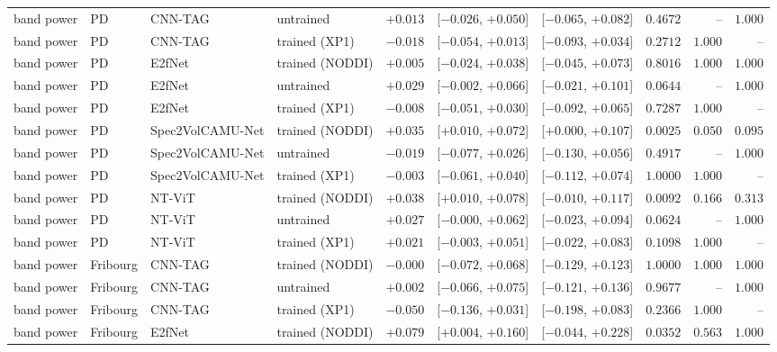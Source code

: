 \documentclass[10pt]{article}
\begin{document}
\begin{longtable}{l l l l r c c r r r}
        band power & PD & CNN-TAG & untrained & $+0.013$ & [$-0.026$, $+0.050$] & [$-0.065$, $+0.082$] & $0.4672$ & -- & $1.000$ \\
        band power & PD & CNN-TAG & trained (XP1) & $-0.018$ & [$-0.054$, $+0.013$] & [$-0.093$, $+0.034$] & $0.2712$ & $1.000$ & -- \\
        band power & PD & E2fNet & trained (NODDI) & $+0.005$ & [$-0.024$, $+0.038$] & [$-0.045$, $+0.073$] & $0.8016$ & $1.000$ & $1.000$ \\
        band power & PD & E2fNet & untrained & $+0.029$ & [$-0.002$, $+0.066$] & [$-0.021$, $+0.101$] & $0.0644$ & -- & $1.000$ \\
        band power & PD & E2fNet & trained (XP1) & $-0.008$ & [$-0.051$, $+0.030$] & [$-0.092$, $+0.065$] & $0.7287$ & $1.000$ & -- \\
        band power & PD & Spec2VolCAMU-Net & trained (NODDI) & $+0.035$ & [$+0.010$, $+0.072$] & [$+0.000$, $+0.107$] & $0.0025$ & $0.050$ & $0.095$ \\
        band power & PD & Spec2VolCAMU-Net & untrained & $-0.019$ & [$-0.077$, $+0.026$] & [$-0.130$, $+0.056$] & $0.4917$ & -- & $1.000$ \\
        band power & PD & Spec2VolCAMU-Net & trained (XP1) & $-0.003$ & [$-0.061$, $+0.040$] & [$-0.112$, $+0.074$] & $1.0000$ & $1.000$ & -- \\
        band power & PD & NT-ViT & trained (NODDI) & $+0.038$ & [$+0.010$, $+0.078$] & [$-0.010$, $+0.117$] & $0.0092$ & $0.166$ & $0.313$ \\
        band power & PD & NT-ViT & untrained & $+0.027$ & [$-0.000$, $+0.062$] & [$-0.023$, $+0.094$] & $0.0624$ & -- & $1.000$ \\
        band power & PD & NT-ViT & trained (XP1) & $+0.021$ & [$-0.003$, $+0.051$] & [$-0.022$, $+0.083$] & $0.1098$ & $1.000$ & -- \\
        band power & Fribourg & CNN-TAG & trained (NODDI) & $-0.000$ & [$-0.072$, $+0.068$] & [$-0.129$, $+0.123$] & $1.0000$ & $1.000$ & $1.000$ \\
        band power & Fribourg & CNN-TAG & untrained & $+0.002$ & [$-0.066$, $+0.075$] & [$-0.121$, $+0.136$] & $0.9677$ & -- & $1.000$ \\
        band power & Fribourg & CNN-TAG & trained (XP1) & $-0.050$ & [$-0.136$, $+0.031$] & [$-0.198$, $+0.083$] & $0.2366$ & $1.000$ & -- \\
        band power & Fribourg & E2fNet & trained (NODDI) & $+0.079$ & [$+0.004$, $+0.160$] & [$-0.044$, $+0.228$] & $0.0352$ & $0.563$ & $1.000$ \\

\end{longtable}
\end{document}
